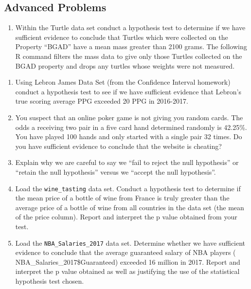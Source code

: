 \documentclass[
]{book}
\newenvironment{Shaded}{\begin{snugshade}}{\end{snugshade}}
\newcommand{\FunctionTok}[1]{\textcolor[rgb]{0.00,0.00,0.00}{#1}}
\newcommand{\NormalTok}[1]{#1}
\newcommand{\OtherTok}[1]{\textcolor[rgb]{0.56,0.35,0.01}{#1}}
\newcommand{\SpecialCharTok}[1]{\textcolor[rgb]{0.00,0.00,0.00}{#1}}
\newcommand{\StringTok}[1]{\textcolor[rgb]{0.31,0.60,0.02}{#1}}
\providecommand{\tightlist}{%
  \setlength{\itemsep}{0pt}\setlength{\parskip}{0pt}}
\theoremstyle{definition}
\theoremstyle{definition}
\theoremstyle{definition}
\theoremstyle{definition}
\theoremstyle{remark}
\begin{document}
\hypertarget{advanced-problems-12}{%
\subsection{Advanced Problems}\label{advanced-problems-12}}

\begin{enumerate}
\def\labelenumi{\arabic{enumi}.}
\tightlist
\item
  Within the Turtle data set conduct a hypothesis test to determine if we have sufficient evidence to conclude that Turtles which were collected on the Property ``BGAD'' have a mean mass greater than 2100 grams. The following R command filters the mass data to give only those Turtles collected on the BGAD property and drops any turtles whose weights were not measured.
\end{enumerate}

\begin{Shaded}
\end{Shaded}

\begin{enumerate}
\def\labelenumi{\arabic{enumi}.}
\setcounter{enumi}{1}
\item
  Using Lebron James Data Set (from the Confidence Interval homework) conduct a hypothesis test to see if we have sufficient evidence that Lebron's true scoring average PPG exceeded 20 PPG in 2016-2017.
\item
  You suspect that an online poker game is not giving you random cards. The odds a receiving two pair in a five card hand determined randomly is 42.25\%. You have played 100 hands and only started with a single pair 32 times. Do you have sufficient evidence to conclude that the website is cheating?
\item
  Explain why we are careful to say we ``fail to reject the null hypothesis'' or ``retain the null hypothesis'' versus we ``accept the null hypothesis''.
\item
  Load the \texttt{wine\_tasting} data set. Conduct a hypothesis test to determine if the mean price of a bottle of wine from France is truly greater than the average price of a bottle of wine from all countries in the data set (the mean of the price column). Report and interpret the p value obtained from your test.
\item
  Load the \texttt{NBA\_Salaries\_2017} data set. Determine whether we have sufficient evidence to conclude that the average guaranteed salary of NBA players ( NBA\_Salaries\_2017\$Guaranteed) exceeded 16 million in 2017. Report and interpret the p value obtained as well as justifying the use of the statistical hypothesis test chosen.
\end{enumerate}
\end{document}
